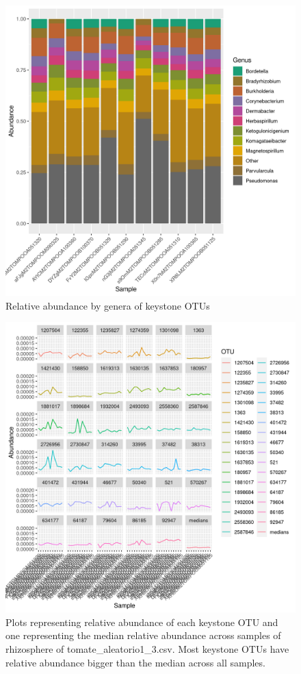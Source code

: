 \begin{figure}
\centering
\includegraphics[scale = 0.8]{tomate_aleatorio1_3.csv_relative_abundance_Genus.png}
\caption{Relative abundance by genera of keystone OTUs }
\label{fig:tomate_aleatorio1_3.csv_genus}
\end{figure}
\begin{figure}
   \centering
   \includegraphics[scale = 0.8]{abundance_tomate_aleatorio1_3.csv_key_otus_medians.png}
   \caption{Plots representing relative abundance of each keystone OTU and one representing the median relative abundance  across samples of rhizosphere of tomate_aleatorio1_3.csv. Most keystone OTUs have relative abundance bigger than the median across all samples.  }
   \label{key_otus_vs_medians_tomate_aleatorio1_3.csv}
\end{figure}

